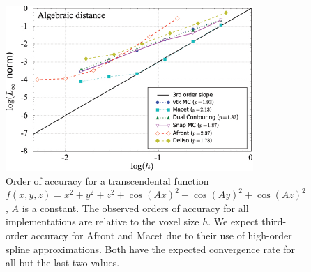 

\begin{figure}
\centering
\includegraphics[width=0.84\linewidth,keepaspectratio=true]{chapter2/figures/afront_meshconv-onh.pdf}
  \caption{Order of accuracy for a transcendental function 
$f(x,y,z) = x^2 + y^2 + z^2 + \cos(Ax)^2 + \cos(Ay)^2 + \cos(Az)^2$, $A$ 
is a constant. The observed orders of accuracy for all implementations 
are relative to the voxel size $h$.
We expect third-order accuracy for 
Afront and Macet due to their use of high-order spline approximations.
Both have the expected convergence rate for all but the last two values.}
  \label{fig:afront-meshconvonh}
\end{figure}


